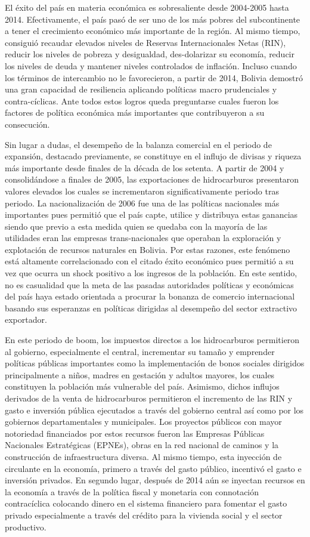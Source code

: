 \documentclass[12pt,letterpaper]{article}
\begin{document}
El éxito del país en materia económica es sobresaliente desde 2004-2005 hasta 2014. Efectivamente, el país pasó de ser uno de los más pobres del subcontinente a tener el crecimiento económico más importante de la región. Al mismo tiempo, consiguió recaudar elevados niveles de Reservas Internacionales Netas (RIN), reducir los niveles de pobreza y desigualdad, des-dolarizar su economía, reducir los niveles de deuda y mantener niveles controlados de inflación. Incluso cuando los términos de intercambio no le favorecieron, a partir de 2014, Bolivia demostró una gran capacidad de resiliencia aplicando políticas macro prudenciales y contra-cíclicas. Ante todos estos logros queda preguntarse cuales fueron los factores de política económica más importantes que contribuyeron a su consecución.

Sin lugar a dudas, el desempeño de la balanza comercial en el periodo de expansión, destacado previamente, se constituye en el influjo de divisas y riqueza más importante desde finales de la década de los setenta. A partir de 2004 y consolidándose a finales de 2005, las exportaciones de hidrocarburos presentaron valores elevados los cuales se incrementaron significativamente periodo tras periodo. La nacionalización de 2006 fue una de las políticas nacionales más importantes pues permitió que el país capte, utilice y distribuya estas ganancias siendo que previo a esta medida quien se quedaba con la mayoría de las utilidades eran las empresas trans-nacionales que operaban la exploración y explotación de recursos naturales en Bolivia. Por estas razones, este fenómeno está altamente correlacionado con el citado éxito económico pues permitió a su vez que ocurra un shock positivo a los ingresos de la población. En este sentido, no es casualidad que la meta de las pasadas autoridades políticas y económicas del país haya estado orientada a procurar la bonanza de comercio internacional basando sus esperanzas en políticas dirigidas al desempeño del sector extractivo exportador.

En este periodo de boom, los impuestos directos a los hidrocarburos permitieron al gobierno, especialmente el central, incrementar su tamaño y emprender políticas públicas importantes como la implementación de bonos sociales dirigidos principalmente a niños, madres en gestación y adultos mayores, los cuales constituyen la población más vulnerable del país. Asimismo, dichos influjos derivados de la venta de hidrocarburos permitieron el incremento de las RIN y gasto e inversión pública ejecutados a través del gobierno central así como por los gobiernos departamentales y municipales. Los proyectos públicos con mayor notoriedad financiados por estos recursos fueron las Empresas Públicas Nacionales Estratégicas (EPNEs), obras en la red nacional de caminos y la construcción de infraestructura diversa. Al mismo tiempo, esta inyección de circulante en la economía, primero a través del gasto público, incentivó el gasto e inversión privados. En segundo lugar, después de 2014 aún se inyectan recursos en la economía a través de la política fiscal y monetaria con connotación contracíclica colocando dinero en el sistema financiero para fomentar el gasto privado especialmente a través del crédito para la vivienda social y el sector productivo. 
\end{document}
